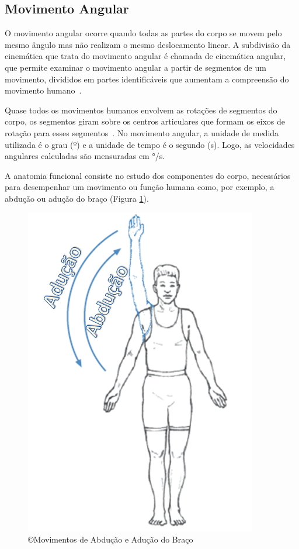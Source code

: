 
\subsection{Movimento Angular}
O movimento angular ocorre quando todas as partes do corpo se movem pelo mesmo ângulo mas não realizam o mesmo deslocamento linear. A subdivisão da cinemática que trata do movimento angular é chamada de cinemática angular, que permite examinar o movimento angular a partir de segmentos de um movimento, divididos em partes identificáveis que aumentam a compreensão do movimento humano~\cite{hamill1999bases}. 

Quase todos os movimentos humanos envolvem as rotações de segmentos do corpo, os segmentos giram sobre os centros articulares que formam os eixos de rotação para esses segmentos~\cite{hamill1999bases}. No movimento angular, a unidade de medida utilizada é o grau (º) e a unidade de tempo é o segundo (s). Logo, as velocidades angulares calculadas são mensuradas em °/s.

A anatomia funcional consiste no estudo dos componentes do corpo, necessários para desempenhar um movimento ou função humana como, por exemplo, a abdução ou adução do braço (Figura \ref{fig:movabducaoaducao}).

\begin{figure}
 \centering
 \includegraphics[scale=0.5]{./img/abducao.png}
\caption[Movimentos de Abdução e Adução do Braço]{\copyright Movimentos de Abdução e Adução do Braço~\cite{mcginnis2013biomechanics}}
 \label{fig:movabducaoaducao}
\end{figure}

